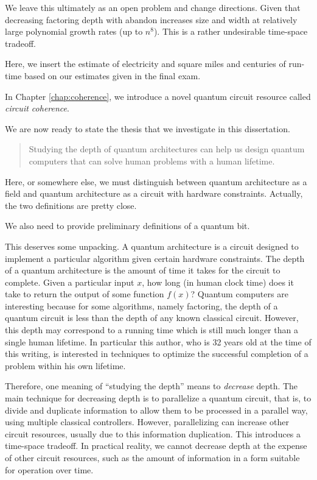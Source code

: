 We leave this ultimately as an open problem and change directions.
Given that decreasing factoring depth with abandon increases size and width at relatively large polynomial growth rates (up to $n^8$). This is a rather undesirable time-space tradeoff.

Here, we insert the estimate of electricity and square miles and centuries of run-time based on our estimates given in the final exam.

In Chapter \ref{chap:coherence}, we introduce a novel quantum circuit resource called \emph{circuit coherence}.

We are now ready to state the thesis that we investigate in this dissertation.

\begin{quote}
Studying the depth of quantum architectures can help us design quantum computers that can solve
human problems with a human lifetime.
\end{quote}

Here, or somewhere else, we must distinguish between quantum architecture as a field and quantum architecture as a
circuit with hardware constraints. Actually, the two definitions are pretty close.

We also need to provide preliminary definitions of a quantum bit.

This deserves some unpacking. A quantum architecture is a circuit designed to implement a particular algorithm given certain
hardware constraints. The depth of a quantum architecture is the amount of time it takes for the circuit to complete.
Given a particular input $x$, how long (in human clock time) does it take to return the output of some function $f(x)$?
Quantum computers are interesting because for some algorithms, namely factoring, the depth of a quantum circuit is
less than the depth of any known classical circuit. However, this depth may correspond to a running time which is
still much longer than a single human lifetime. In particular this author, who is 32 years old at the time of this
writing, is interested in techniques to optimize the successful completion of a problem within his own lifetime.

Therefore, one meaning of ``studying the depth'' means to \emph{decrease} depth. The main technique for decreasing
depth is to parallelize a quantum circuit, that is, to divide and duplicate information to allow them to be processed
in a parallel way, using multiple classical controllers. However, parallelizing can increase other circuit resources,
usually due to this information duplication. This introduces a time-space tradeoff. In practical reality, we cannot
decrease depth at the expense of other circuit resources, such as the amount of information in a form suitable for
operation over time.

